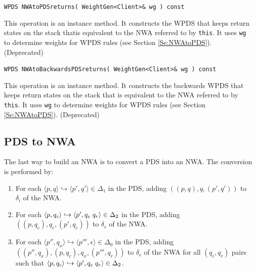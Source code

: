 \begin{description}
  \item\texttt{WPDS NWAtoPDSreturns( WeightGen<Client>\& wg ) const} \nopagebreak

    This operation is an instance method.  It constructs the WPDS that keeps
    return states on the stack thatis equivalent to the NWA referred to by
    \texttt{this}.  It uses \texttt{wg} to determine weights for WPDS rules
    (see Section \ref{Se:NWAtoPDS}).  (Deprecated)

  \item\texttt{WPDS NWAtoBackwardsPDSreturns( WeightGen<Client>\& wg ) const} \nopagebreak

    This operation is an instance method.  It constructs the backwards WPDS
    that keeps return states on the stack that is equivalent to the NWA
    referred to by \texttt{this}.  It uses \texttt{wg} to determine weights
    for WPDS rules (see Section \ref{Se:NWAtoPDS}).  (Deprecated) \\

\end{description}

\subsection{PDS to NWA}
\label{Se:PDStoNWA}

The last way to build an NWA is to convert a PDS into an NWA.  The conversion
is performed by:

\begin{enumerate}

\item For each $\langle p,q \rangle \hookrightarrow \langle p',q' \rangle \in
  \Delta_1$ in the PDS, adding $( (p,q), q, (p',q') )$ to $\delta_i$ of the
  NWA.

\item For each $\langle p,q_c \rangle \hookrightarrow \langle
  p',q_e \hspace{.1cm} q_r \rangle \in \Delta_2$ in the PDS, adding $(
  (p,q_c), q_c, (p',q_e) )$ to $\delta_c$ of the NWA.

\item For each $\langle p'',q_x \rangle \hookrightarrow \langle p''',\epsilon
  \rangle \in \Delta_0$ in the PDS, adding $( (p'',q_x), (p,q_c), q_x,
  (p''',q_r) )$ to $\delta_r$ of the NWA for all $(q_c,q_r)$ pairs such that
  $\langle p,q_c \rangle \hookrightarrow \langle p',q_e \hspace{.1cm} q_r
  \rangle \in \Delta_2$.

\end{enumerate}

